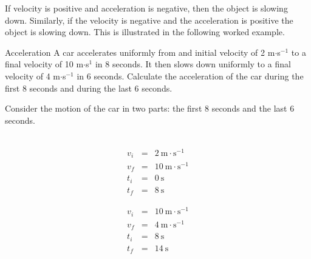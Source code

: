 If velocity is positive and acceleration is negative, then the object is slowing down. Similarly, if the velocity is negative and the acceleration is positive the object is slowing down. This is illustrated in the following worked example.\par \vspace{-1cm}
\begin{wex}{Acceleration}
{A car accelerates uniformly from and initial velocity of 2 m$\cdot$s$^{-1}$ to a final velocity of 10 m$\cdot$s$^1$ in 8 seconds. It then slows down uniformly to a final velocity of 4 m$\cdot$s$^{-1}$ in 6 seconds. Calculate the acceleration of the car during the first 8 seconds and during the last 6 seconds.}
{
Consider the motion of the car in two parts: the first 8 seconds and the last 6 seconds.\\
\\
\begin{minipage}{0.5\textwidth}
\begin{eqnarray*}
v_i &=& 2~\text{m}\cdot \text{s}^{-1}\\
v_f &=& 10~\text{m}\cdot \text{s}^{-1}\\
t_i &=& 0~\text{s}\\
t_f &=& 8~\text{s}
\end{eqnarray*}
\end{minipage}
\begin{minipage}{0.5\textwidth}
\begin{eqnarray*}
v_i &=& 10~\text{m}\cdot \text{s}^{-1}\\
v_f &=& 4~\text{m}\cdot \text{s}^{-1}\\
t_i &=& 8~\text{s}\\
t_f &=& 14~\text{s}
\end{eqnarray*}
\end{minipage}\\

}
\end{wex}
